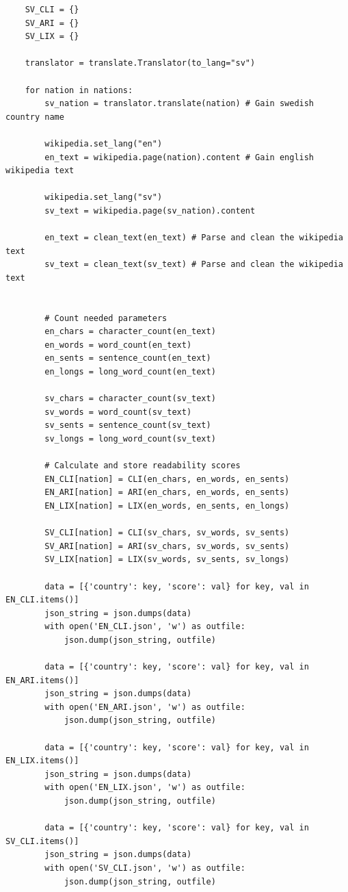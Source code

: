 \documentclass[a4paper]{article}
\begin{document}
\begin{verbatim}
    SV_CLI = {}
    SV_ARI = {}
    SV_LIX = {}
    
    translator = translate.Translator(to_lang="sv")

    for nation in nations:
        sv_nation = translator.translate(nation) # Gain swedish country name
       
        wikipedia.set_lang("en")
        en_text = wikipedia.page(nation).content # Gain english wikipedia text
        
        wikipedia.set_lang("sv")
        sv_text = wikipedia.page(sv_nation).content
        
        en_text = clean_text(en_text) # Parse and clean the wikipedia text
        sv_text = clean_text(sv_text) # Parse and clean the wikipedia text
        
            
        # Count needed parameters
        en_chars = character_count(en_text)
        en_words = word_count(en_text)
        en_sents = sentence_count(en_text)
        en_longs = long_word_count(en_text)
        
        sv_chars = character_count(sv_text)
        sv_words = word_count(sv_text)
        sv_sents = sentence_count(sv_text)
        sv_longs = long_word_count(sv_text)
        
        # Calculate and store readability scores
        EN_CLI[nation] = CLI(en_chars, en_words, en_sents)
        EN_ARI[nation] = ARI(en_chars, en_words, en_sents)
        EN_LIX[nation] = LIX(en_words, en_sents, en_longs)

        SV_CLI[nation] = CLI(sv_chars, sv_words, sv_sents)
        SV_ARI[nation] = ARI(sv_chars, sv_words, sv_sents)
        SV_LIX[nation] = LIX(sv_words, sv_sents, sv_longs)    

        data = [{'country': key, 'score': val} for key, val in EN_CLI.items()]
        json_string = json.dumps(data)
        with open('EN_CLI.json', 'w') as outfile:
            json.dump(json_string, outfile)
    
        data = [{'country': key, 'score': val} for key, val in EN_ARI.items()]
        json_string = json.dumps(data)
        with open('EN_ARI.json', 'w') as outfile:
            json.dump(json_string, outfile)
    
        data = [{'country': key, 'score': val} for key, val in EN_LIX.items()]
        json_string = json.dumps(data)
        with open('EN_LIX.json', 'w') as outfile:
            json.dump(json_string, outfile)
    
        data = [{'country': key, 'score': val} for key, val in SV_CLI.items()]
        json_string = json.dumps(data)
        with open('SV_CLI.json', 'w') as outfile:
            json.dump(json_string, outfile)
    

\end{verbatim}
\end{document}
